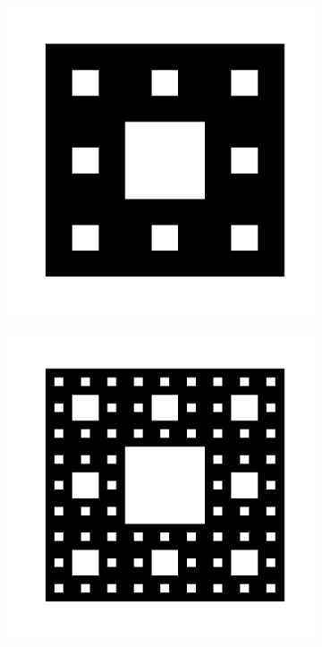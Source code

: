 \begin{figure}[tbh!]
\begin{subfigure}[b!]{0.25 \textwidth}
     \end{subfigure}\hspace*{-0.9em}
     \begin{subfigure}[b!]{0.25 \textwidth}
         \caption{}
         \includegraphics[width=\textwidth]{Imagenes/Fractal/sierpinski_carpet_3.pdf}
     \end{subfigure}\hspace*{-0.9em}
     \begin{subfigure}[b!]{0.25 \textwidth}
         \caption{}
         \includegraphics[width=\textwidth]{Imagenes/Fractal/sierpinski_carpet_4.pdf}

\end{subfigure}
\end{figure}

